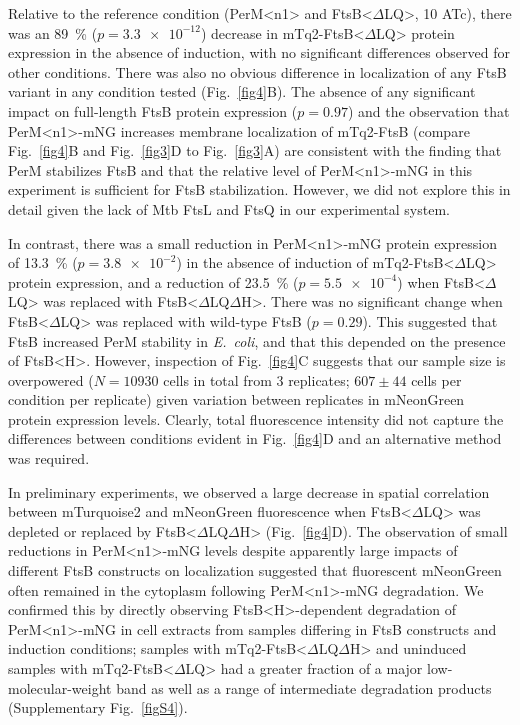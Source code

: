 \documentclass[pdflatex,sn-nature]{sn-jnl}%
\def\textsuperscript#1{<#1>}%
\newcommand\ec{\textit{E.~coli}}
\newcommand\ftsbH{FtsB\textsuperscript{H}}
\newcommand\ftsbdLQ{FtsB\textsuperscript{$\Delta{}$LQ}}
\newcommand\ftsbdLQdH{FtsB\textsuperscript{$\Delta{}$LQ$\Delta{}$H}}
\newcommand\permN{PerM\textsuperscript{n1}}
\begin{document}
Relative to the reference condition (\permN{} and \ftsbdLQ{}, \qty{10}{\nM} ATc), there was an \qty{89}{\percent} ($p=\num{3.3e-12}$) decrease in mTq2-\ftsbdLQ{} protein expression in the absence of induction, with no significant differences observed for other conditions.
There was also no obvious difference in localization of any FtsB variant in any condition tested (Fig.~\ref{fig4}B).
The absence of any significant impact on full-length FtsB protein expression ($p=0.97$) and the observation that \permN{}-mNG increases membrane localization of mTq2-FtsB (compare Fig.~\ref{fig4}B and Fig.~\ref{fig3}D to Fig.~\ref{fig3}A) are consistent with the finding that PerM stabilizes FtsB \citep{wangPersistentMycobacteriumTuberculosis2019} and that the relative level of \permN{}-mNG in this experiment is sufficient for FtsB stabilization.
However, we did not explore this in detail given the lack of Mtb FtsL and FtsQ in our experimental system.

In contrast, there was a small reduction in \permN{}-mNG protein expression of \qty{13.3}{\percent} ($p=\num{3.8e-2}$) in the absence of induction of mTq2-\ftsbdLQ{} protein expression, and a reduction of \qty{23.5}{\percent} ($p=\num{5.5e-4}$) when \ftsbdLQ{} was replaced with \ftsbdLQdH{}.
There was no significant change when \ftsbdLQ{} was replaced with wild-type FtsB ($p=0.29$). This suggested that FtsB increased PerM stability in \ec{}, and that this depended on the presence of \ftsbH{}.
However, inspection of Fig.~\ref{fig4}C suggests that our sample size is overpowered ($N=\num{10930}$ cells in total from 3 replicates; $607 \pm 44$ cells per condition per replicate) given variation between replicates in mNeonGreen protein expression levels.
Clearly, total fluorescence intensity did not capture the differences between conditions evident in Fig.~\ref{fig4}D and an alternative method was required.

In preliminary experiments, we observed a large decrease in spatial correlation between mTurquoise2 and mNeonGreen fluorescence when \ftsbdLQ{} was depleted or replaced by \ftsbdLQdH{} (Fig.~\ref{fig4}D).
The observation of small reductions in \permN{}-mNG levels despite apparently large impacts of different FtsB constructs on localization suggested that fluorescent mNeonGreen often remained in the cytoplasm following \permN{}-mNG degradation.
We confirmed this by directly observing \ftsbH{}-dependent degradation of \permN{}-mNG in cell extracts from samples differing in FtsB constructs and induction conditions; samples with mTq2-\ftsbdLQdH{} and uninduced samples with mTq2-\ftsbdLQ{} had a greater fraction of a major low-molecular-weight band as well as a range of intermediate degradation products (Supplementary Fig.~\ref{figS4}).
\end{document}
